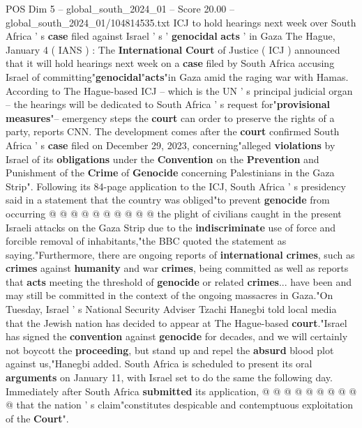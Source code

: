 \begin{textsample}{POS Dim 5 – global\_south\_2024\_01 – Score 20.00 – global\_south\_2024\_01/104814535.txt}  \label{ex:f5_pos_014}
ICJ to hold hearings next week over South Africa ' s \textbf{case} filed against Israel ' s ' \textbf{genocidal} \textbf{acts} ' in Gaza The Hague, January 4 ( IANS ) : The \textbf{International} \textbf{Court} of Justice ( ICJ ) announced that it will hold hearings next week on a \textbf{case} filed by South Africa accusing Israel of committing"\textbf{genocidal}"\textbf{acts}"in Gaza amid the raging war with Hamas.
According to The Hague-based ICJ -- which is the UN ' s principal judicial organ -- the hearings will be dedicated to South Africa ' s request for"\textbf{provisional} \textbf{measures}"-- emergency steps the \textbf{court} can order to preserve the rights of a party, reports CNN.
The development comes after the \textbf{court} confirmed South Africa ' s \textbf{case} filed on December 29, 2023, concerning"alleged \textbf{violations} by Israel of its \textbf{obligations} under the \textbf{Convention} on the \textbf{Prevention} and Punishment of the \textbf{Crime} of \textbf{Genocide} concerning Palestinians in the Gaza Strip".
Following its 84-page application to the ICJ, South Africa ' s presidency said in a statement that the country was obliged"to prevent \textbf{genocide} from occurring @ @ @ @ @ @ @ @ @ @ the plight of civilians caught in the present Israeli attacks on the Gaza Strip due to the \textbf{indiscriminate} use of force and forcible removal of inhabitants,"the BBC quoted the statement as saying."Furthermore, there are ongoing reports of \textbf{international} \textbf{crimes}, such as \textbf{crimes} against \textbf{humanity} and war \textbf{crimes}, being committed as well as reports that \textbf{acts} meeting the threshold of \textbf{genocide} or related \textbf{crimes}... have been and may still be committed in the context of the ongoing massacres in Gaza."On Tuesday, Israel ' s National Security Adviser Tzachi Hanegbi told local media that the Jewish nation has decided to appear at The Hague-based \textbf{court}."Israel has signed the \textbf{convention} against \textbf{genocide} for decades, and we will certainly not boycott the \textbf{proceeding}, but stand up and repel the \textbf{absurd} blood plot against us,"Hanegbi added.
South Africa is scheduled to present its oral \textbf{arguments} on January 11, with Israel set to do the same the following day.
Immediately after South Africa \textbf{submitted} its application, @ @ @ @ @ @ @ @ @ @ that the nation ' s claim"constitutes despicable and contemptuous exploitation of the \textbf{Court}".

\end{textsample}
